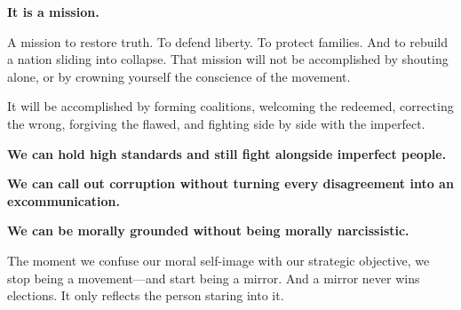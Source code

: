 \textbf{It is a mission.}

A mission to restore truth. To defend liberty. To protect families. And to rebuild a nation sliding into collapse. That mission will not be accomplished by shouting alone, or by crowning yourself the conscience of the movement.

It will be accomplished by forming coalitions, welcoming the redeemed, correcting the wrong, forgiving the flawed, and fighting side by side with the imperfect.

\textbf{We can hold high standards and still fight alongside imperfect people.}

\textbf{We can call out corruption without turning every disagreement into an excommunication.}

\textbf{We can be morally grounded without being morally narcissistic.}

The moment we confuse our moral self-image with our strategic objective, we stop being a movement—and start being a mirror. And a mirror never wins elections. It only reflects the person staring into it.

